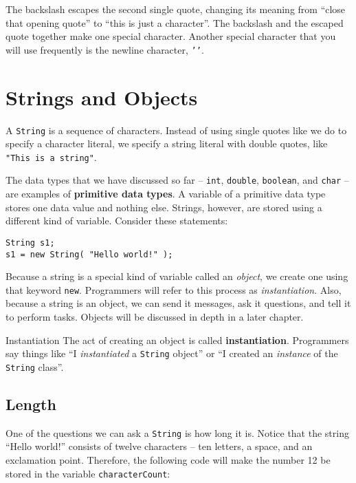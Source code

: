 The backslash escapes the second single quote, changing its meaning from ``close that opening quote'' to ``this is just a character''.  The backslash and the escaped quote together make one special character.  Another special character that you will use frequently is the newline character, \texttt{'\n'}.

\section{Strings and Objects}
\label{section:string}

A \texttt{String} is a sequence of characters.  Instead of using single quotes like we do to specify a character literal, we specify a string literal with double quotes, like \texttt{"This is a string"}.

The data types that we have discussed so far -- \texttt{int}, \texttt{double}, \texttt{boolean}, and \texttt{char} -- are examples of \textbf{primitive data types}.  A variable of a primitive data type stores one data value and nothing else.  Strings, however, are stored using a different kind of variable.  Consider these statements:

\begin{verbatim}
String s1;
s1 = new String( "Hello world!" );
\end{verbatim}

Because a string is a special kind of variable called an \textit{object}, we create one using that keyword \texttt{new}.  Programmers will refer to this process as \textit{instantiation}.  Also, because a string is an object, we can send it messages, ask it questions, and tell it to perform tasks.  Objects will be discussed in depth in a later chapter.

\begin{defn}{Instantiation}\label{defn:instantiation}
The act of creating an object is called \textbf{instantiation}.  Programmers say things like ``I \textit{instantiated} a \texttt{String} object'' or ``I created an \textit{instance} of the \texttt{String} class''.
\end{defn}

\subsection{Length}
One of the questions we can ask a \texttt{String} is how long it is.  Notice that the string ``Hello world!'' consists of twelve characters -- ten letters, a space, and an exclamation point.  Therefore, the following code will make the number 12 be stored in the variable \texttt{characterCount}:

